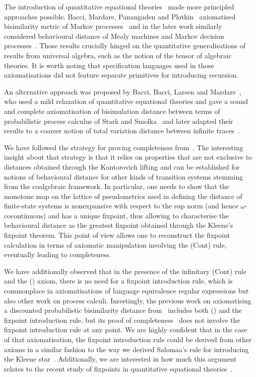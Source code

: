 The introduction of quantitative equational theories~\cite{Mardare:2016:Quantitative} made more principled approaches possible. Bacci, Mardare, Panangaden and Plotkin~\cite{Bacci:2018:Algebraic} axiomatised bisimilarity metric of Markov processes~\cite{Desharnais:2004:Metrics} and in the later work similarly considered behavioural distance of Mealy machines and Markov decision processes~\cite{Bacci:2024:Sum}. Those results crucially hinged on the quantitative generalisations of results from universal algebra, such as the notion of the tensor of algebraic theories. It is worth noting that specification languages used in those axiomatisations did not feature separate primitives for introducing recursion.

An alternative approach was proposed by Bacci, Bacci, Larsen and Mardare~\cite{Bacci:2018:Bisimilarity}, who used a mild relaxation of quantitative equational theories and gave a sound and complete axiomatisation of bisimulation distance between terms of probabilistic process calculus of Stark and Smolka~\cite{Stark:2000:Complete} and later adapted their results to a coarser notion of total variation distance between infinite traces~\cite{Bacci:2018:TV}. 

We have followed the strategy for proving completeness from~\cite{Bacci:2018:Bisimilarity}. The interesting insight about that strategy is that it relies on properties that are not exclusive to distances obtained through the Kantorovich lifting and can be established for notions of behavioural distance for other kinds of transition systems stemming from the coalgebraic framework. In particular, one needs to show that the monotone map on the lattice of pseudometrics used in defining the distance of finite-state systems is nonexpansive with respect to the sup norm (and hence $\omega$-cocontinuous) and has a unique fixpoint, thus allowing to characterise the behavioural distance as the greatest fixpoint obtained through the Kleene's fixpoint theorem. This point of view allows one to reconstruct the fixpoint calculation in terms of axiomatic manipulation involving the \textsf{(Cont)} rule, eventually leading to completeness.

We have additionally observed that in the presence of the infinitary \textsf{(Cont)} rule and the \textsf{(\dPref)} axiom, there is no need for a fixpoint introduction rule, which is commonplace in axiomatisations of language equivalence regular expressions but also other work on process calculi. Inrestingly, the previous work on axiomatising a discounted probabilistic bisimilarity distance from~\cite{Bacci:2018:Bisimilarity} includes both \textsf{(\dPref)} and the fixpoint introduction rule, but its proof of completeness~\cite[Theorem~6.4]{Bacci:2018:Bisimilarity} does not involve the fixpoint introduction rule at any point. We are highly confident that in the case of that axiomatisation, the fixpoint introduction rule could be derived from other axioms in a similar fashion to the way we derived Salomaa's rule for introducing the Kleene star~\cite{Salomaa:1966:Two}. Additionally, we are interested in how much this argument relates to the recent study of fixpoints in quantitative equational theories~\cite{Mardare:2021:Fixed}. 

